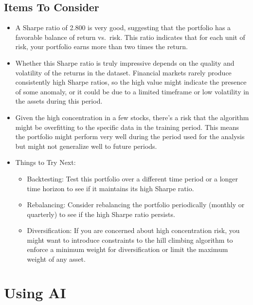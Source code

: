 \documentclass[
  letterpaper,
  DIV=11,
  numbers=noendperiod]{scrreprt}
\providecommand{\tightlist}{%
  \setlength{\itemsep}{0pt}\setlength{\parskip}{0pt}}\usepackage{longtable,booktabs,array}
\begin{document}
\section{Items To Consider}\label{items-to-consider}

\begin{itemize}
\tightlist
\item
  A Sharpe ratio of 2.800 is very good, suggesting that the portfolio
  has a favorable balance of return vs.~risk. This ratio indicates that
  for each unit of risk, your portfolio earns more than two times the
  return.
\item
  Whether this Sharpe ratio is truly impressive depends on the quality
  and volatility of the returns in the dataset. Financial markets rarely
  produce consistently high Sharpe ratios, so the high value might
  indicate the presence of some anomaly, or it could be due to a limited
  timeframe or low volatility in the assets during this period.
\item
  Given the high concentration in a few stocks, there's a risk that the
  algorithm might be overfitting to the specific data in the training
  period. This means the portfolio might perform very well during the
  period used for the analysis but might not generalize well to future
  periods.
\item
  Things to Try Next:

  \begin{itemize}
  \tightlist
  \item
    Backtesting: Test this portfolio over a different time period or a
    longer time horizon to see if it maintains its high Sharpe ratio.
  \item
    Rebalancing: Consider rebalancing the portfolio periodically
    (monthly or quarterly) to see if the high Sharpe ratio persists.
  \item
    Diversification: If you are concerned about high concentration risk,
    you might want to introduce constraints to the hill climbing
    algorithm to enforce a minimum weight for diversification or limit
    the maximum weight of any asset.
  \end{itemize}
\end{itemize}


\chapter{Using AI}\label{using-ai-5}
\end{document}
